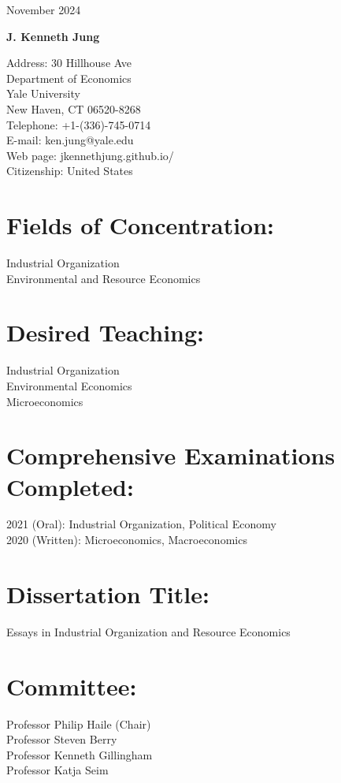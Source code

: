 \documentclass[11pt,letterpaper]{article}
\begin{document}
\noindent November 2024

\vspace{0.5cm}

\begin{center}
{\Large \textbf{J. Kenneth Jung}}
\end{center}

\noindent Address: 30 Hillhouse Ave \\
Department of Economics \\
Yale University \\
New Haven, CT 06520-8268 \\
Telephone: +1-(336)-745-0714 \\
E-mail: ken.jung@yale.edu \\
Web page: jkennethjung.github.io/ \\
Citizenship: United States

\section*{Fields of Concentration:}
Industrial Organization \\
Environmental and Resource Economics

\section*{Desired Teaching:}
Industrial Organization \\
Environmental Economics \\
Microeconomics

\section*{Comprehensive Examinations Completed:}
2021 (Oral): Industrial Organization, Political Economy \\
2020 (Written): Microeconomics, Macroeconomics

\section*{Dissertation Title:} 
Essays in Industrial Organization and Resource Economics

\section*{Committee:}
Professor Philip Haile (Chair) \\
Professor Steven Berry \\
Professor Kenneth Gillingham \\
Professor Katja Seim
\end{document}
